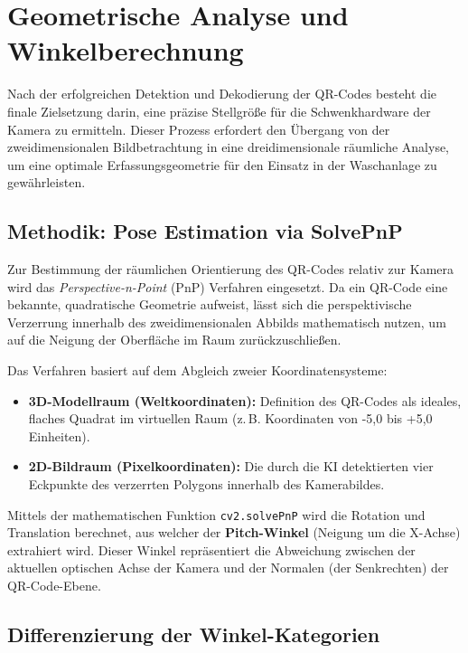 \documentclass[
    a4paper,        %
    11pt,           %
    ngerman,        %
    parskip=half,   %
    listof=totoc,   %
    bibliography=totoc %
]{scrartcl}
\begin{document}
\section{Geometrische Analyse und Winkelberechnung}

Nach der erfolgreichen Detektion und Dekodierung der QR-Codes besteht die finale Zielsetzung darin, eine präzise Stellgröße für die Schwenkhardware der Kamera zu ermitteln. Dieser Prozess erfordert den Übergang von der zweidimensionalen Bildbetrachtung in eine dreidimensionale räumliche Analyse, um eine optimale Erfassungsgeometrie für den Einsatz in der Waschanlage zu gewährleisten.

\subsection{Methodik: Pose Estimation via SolvePnP}

Zur Bestimmung der räumlichen Orientierung des QR-Codes relativ zur Kamera wird das \textit{Perspective-n-Point} (PnP) Verfahren eingesetzt. Da ein QR-Code eine bekannte, quadratische Geometrie aufweist, lässt sich die perspektivische Verzerrung innerhalb des zweidimensionalen Abbilds mathematisch nutzen, um auf die Neigung der Oberfläche im Raum zurückzuschließen.

Das Verfahren basiert auf dem Abgleich zweier Koordinatensysteme:
\begin{itemize}
    \item \textbf{3D-Modellraum (Weltkoordinaten):} Definition des QR-Codes als ideales, flaches Quadrat im virtuellen Raum (z.\,B. Koordinaten von -5,0 bis +5,0 Einheiten).
    \item \textbf{2D-Bildraum (Pixelkoordinaten):} Die durch die KI detektierten vier Eckpunkte des verzerrten Polygons innerhalb des Kamerabildes.
\end{itemize}

Mittels der mathematischen Funktion \texttt{cv2.solvePnP} wird die Rotation und Translation berechnet, aus welcher der \textbf{Pitch-Winkel} (Neigung um die X-Achse) extrahiert wird. Dieser Winkel repräsentiert die Abweichung zwischen der aktuellen optischen Achse der Kamera und der Normalen (der Senkrechten) der QR-Code-Ebene.

\subsection{Differenzierung der Winkel-Kategorien}
\end{document}
